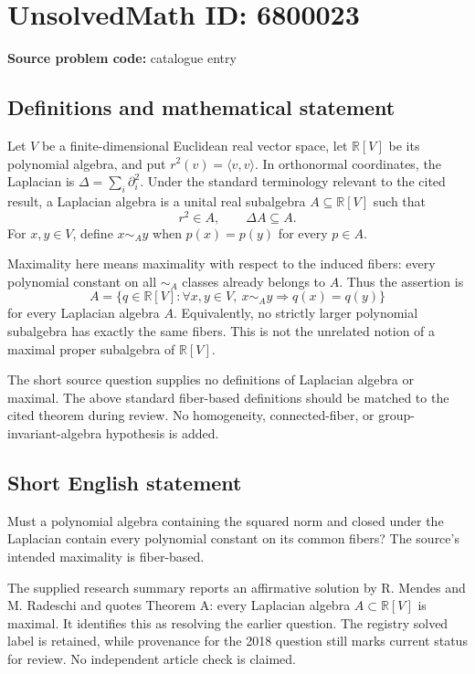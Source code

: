 \documentclass[11pt]{article}
\newcommand{\R}{\mathbb{R}}
\begin{document}
\section*{UnsolvedMath ID: 6800023}
\textbf{Source problem code:} catalogue entry
\subsection{Definitions and mathematical statement}
Let $V$ be a finite-dimensional Euclidean real vector space, let $\R[V]$ be its polynomial algebra, and put $r^2(v)=\langle v,v\rangle$. In orthonormal coordinates, the Laplacian is $\Delta=\sum_i\partial_i^2$. Under the standard terminology relevant to the cited result, a Laplacian algebra is a unital real subalgebra $A\subseteq\R[V]$ such that
\[
 r^2\in A,\qquad \Delta A\subseteq A.
\]
For $x,y\in V$, define $x\sim_A y$ when $p(x)=p(y)$ for every $p\in A$.

Maximality here means maximality with respect to the induced fibers: every polynomial constant on all $\sim_A$ classes already belongs to $A$. Thus the assertion is
\[
 A=\{q\in\R[V]:
        \forall x,y\in V,\ x\sim_Ay\Longrightarrow q(x)=q(y)\}
\]
for every Laplacian algebra $A$. Equivalently, no strictly larger polynomial subalgebra has exactly the same fibers. This is not the unrelated notion of a maximal proper subalgebra of $\R[V]$.

The short source question supplies no definitions of Laplacian algebra or maximal. The above standard fiber-based definitions should be matched to the cited theorem during review. No homogeneity, connected-fiber, or group-invariant-algebra hypothesis is added.
\subsection{Short English statement}
Must a polynomial algebra containing the squared norm and closed under the Laplacian contain every polynomial constant on its common fibers? The source's intended maximality is fiber-based.

The supplied research summary reports an affirmative solution by R. Mendes and M. Radeschi and quotes Theorem A: every Laplacian algebra $A\subset\R[V]$ is maximal. It identifies this as resolving the earlier question. The registry solved label is retained, while provenance for the 2018 question still marks current status for review. No independent article check is claimed.
\end{document}
